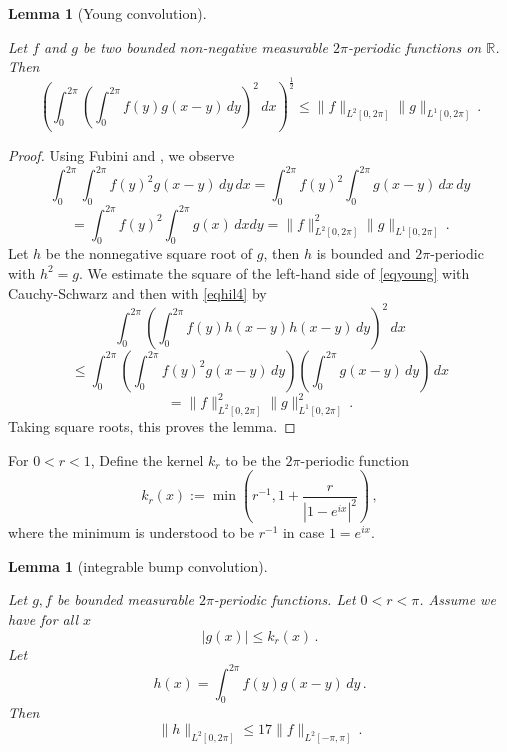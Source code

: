 \documentclass[10pt,a4paper]{article}
\theoremstyle{plain}
\newtheorem{lemma}[theorem]{Lemma}
\theoremstyle{definition}
\numberwithin{equation}{subsection}
\newcommand{\R}{{\mathbb{R}}}
\newcommand{\lean}[1]{}
\newcommand{\uses}[1]{}
\newcommand{\leanok}{}
\begin{document}
\begin{lemma}[Young convolution]\label{Young-convolution}
\leanok
\lean{young_convolution}
\uses{periodic-domain-shift}
    Let $f$ and $g$ be two bounded non-negative measurable $2\pi$-periodic functions on $\R$. Then
    \begin{equation}\label{eqyoung}
        \left(\int_0^{2\pi} \left(\int_0^{2\pi}
        f(y)g(x-y)\, dy\right)^2\, dx\right)^{\frac 12}\le \|f\|_{L^2[0, 2\pi]} \|g\|_{L^1[0, 2\pi]}\, .
    \end{equation}
    \end{lemma}
\begin{proof}
\leanok
    Using Fubini and , we observe
\begin{equation*}
  \int_0^{2\pi}\int_0^{2\pi}f(y)^2g(x-y)\, dy
    \, dx=\int_0^{2\pi}f(y)^2\int_0^{2\pi}g(x-y)\, dx
    \, dy
\end{equation*}
\begin{equation}\label{eqhil4}
=\int_0^{2\pi}f(y)^2\int_0^{2\pi}g(x) \, dx
     dy
=\|f\|_{L^2[0, 2\pi]}^2\|g\|_{L^1[0, 2\pi]}\, .
\end{equation}
   Let $h$ be the nonnegative square root of $g$, then
   $h$ is bounded and $2\pi$-periodic with $h^2=g$.
   We estimate the square of the left-hand side of
   \eqref{eqyoung} with Cauchy-Schwarz and then with
   \eqref{eqhil4} by
       \begin{equation*}
         \int_0^{2\pi} (\int_0^{2\pi}f(y)h(x-y)h(x-y)\, dy)^2\, dx
   \end{equation*}
\begin{equation*}
    \le \int_0^{2\pi}\left(\int_0^{2\pi}f(y)^2g(x-y)\, dy\right)
    \left(\int_0^{2\pi}g(x-y)\, dy\right)\, dx
\end{equation*}
\begin{equation*}
    = \|f\|_{L^2[0, 2\pi]}^2\|g\|_{L^1[0, 2\pi]}^2\, .
\end{equation*}
Taking square roots, this proves the lemma.
\end{proof}

For $0<r<1$, Define the kernel $k_r$ to be the $2\pi$-periodic function
\begin{equation}
    k_r(x):=\min \left(r^{-1}, 1+\frac r{|1-e^{ix}|^2}\right)\, ,
\end{equation}
where the minimum is understood to be $r^{-1}$ in case $1=e^{ix}$.
\begin{lemma}[integrable bump convolution]
\label{integrable-bump-convolution}
\leanok
\lean{integrable_bump_convolution}
\uses{Young-convolution}
Let $g,f$ be bounded measurable $2\pi$-periodic functions. Let $0<r<\pi$.
Assume we have for all $x$
\begin{equation}\label{ebump1}
    |g(x)|\le k_r(x)\, .
\end{equation}
Let
\begin{equation}
   h(x)= \int_0^{2\pi} f(y)g(x-y)\, dy \, .
\end{equation}
Then
\begin{equation}
   \|h\|_{L^2[0, 2\pi]}\le 17\|f\|_{L^2[-\pi, \pi]} \, .
\end{equation}

\end{lemma}
\end{document}
